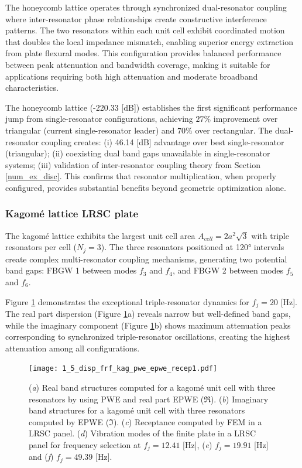 \documentclass[review,numbers,sort&compress]{elsarticle}
\begin{document}
The honeycomb lattice operates through synchronized dual-resonator coupling where inter-resonator phase relationships create constructive interference patterns. The two resonators within each unit cell exhibit coordinated motion that doubles the local impedance mismatch, enabling superior energy extraction from plate flexural modes. This configuration provides balanced performance between peak attenuation and bandwidth coverage, making it suitable for applications requiring both high attenuation and moderate broadband characteristics.

The honeycomb lattice (-220.33 [dB]) establishes the first significant performance jump from single-resonator configurations, achieving $27\%$ improvement over triangular (current single-resonator leader) and $70\%$ over rectangular. The dual-resonator coupling creates: (i) 46.14 [dB] advantage over best single-resonator (triangular); (ii) coexisting dual band gaps unavailable in single-resonator systems; (iii) validation of inter-resonator coupling theory from Section \ref{num_ex_disc}. This confirms that resonator multiplication, when properly configured, provides substantial benefits beyond geometric optimization alone.

\subsubsection{Kagomé lattice LRSC plate}\label{panel_lat_k}

The kagomé lattice exhibits the largest unit cell area $A_{cell} = 2a^2\sqrt{3}$ with triple resonators per cell ($N_j = 3$). The three resonators positioned at 120° intervals create complex multi-resonator coupling mechanisms, generating two potential band gaps: FBGW 1 between modes $f_3$ and $f_4$, and FBGW 2 between modes $f_5$ and $f_6$.

Figure \ref{lat_k_pwe_epwe_tr_frf} demonstrates the exceptional triple-resonator dynamics for $f_j = 20$ [Hz]. The real part dispersion (Figure \ref{lat_k_pwe_epwe_tr_frf}a) reveals narrow but well-defined band gaps, while the imaginary component (Figure \ref{lat_k_pwe_epwe_tr_frf}b) shows maximum attenuation peaks corresponding to synchronized triple-resonator oscillations, creating the highest attenuation among all configurations.

\begin{figure}[htb]
	\centering
	\texttt{[image: 1\_5\_disp\_frf\_kag\_pwe\_epwe\_recep1.pdf]}
	\caption{(\textit{a}) Real band structures computed for a kagomé unit cell with three resonators by using PWE and real part EPWE ($\Re$). (\textit{b}) Imaginary band structures for a kagomé unit cell with three resonators computed by EPWE ($\Im$). (\textit{c}) Receptance computed by FEM in a LRSC panel. (\textit{d}) Vibration modes of the finite plate in a LRSC panel for frequency selection at $f_j = 12.41$ [Hz], (\textit{e}) $f_j = 19.91$ [Hz] and (\textit{f}) $f_j = 49.39$ [Hz].}
	\label{lat_k_pwe_epwe_tr_frf}
\end{figure}
\end{document}
